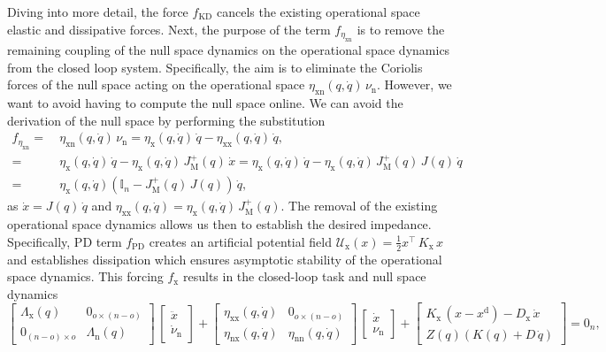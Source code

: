 Diving into more detail, the force $f_\mathrm{KD}$ cancels the existing operational space elastic and dissipative forces.
Next, the purpose of the term $f_{\eta_\mathrm{xn}}$ is to remove the remaining coupling of the null space dynamics on the operational space dynamics from the closed loop system. Specifically, the aim is to eliminate the Coriolis forces of the null space acting on the operational space $\eta_\mathrm{xn}(q,\dot{q}) \, \nu_\mathrm{n}$. However, we want to avoid having to compute the null space online. We can avoid the derivation of the null space by performing the substitution~\citep{ott2008cartesian, della2020model}
\begin{equation}
\begin{split}
    f_{\eta_\mathrm{xn}} =& \: \eta_\mathrm{xn}(q,\dot{q}) \, \nu_\mathrm{n} = \eta_\mathrm{x}(q,\dot{q}) \, \dot{q} - \eta_\mathrm{xx}(q,\dot{q}) \, \dot{q},\\
    =& \: \eta_\mathrm{x}(q,\dot{q}) \, \dot{q} - \eta_\mathrm{x}(q,\dot{q}) \, J_\mathrm{M}^+(q) \, \dot{x} = \eta_\mathrm{x}(q,\dot{q}) \, \dot{q} - \eta_\mathrm{x}(q,\dot{q}) \, J_\mathrm{M}^+(q) \, J(q) \, \dot{q}\\
    =& \: \eta_\mathrm{x}(q,\dot{q}) \left ( \mathbb{I}_n - J_\mathrm{M}^{+}(q) \, J(q)  \right ) \, \dot{q},
\end{split}
\end{equation}
as $\dot{x} = J(q) \, \dot{q}$ and $\eta_\mathrm{xx}(q,\dot{q}) = \eta_\mathrm{x}(q,\dot{q}) \, J_\mathrm{M}^+(q)$.
The removal of the existing operational space dynamics allows us then to establish the desired impedance. Specifically, PD term $f_\mathrm{PD}$ creates an artificial potential field $\mathcal{U}_\mathrm{x}(x) = \frac{1}{2}x^\top \, K_\mathrm{x} \, x$ and establishes dissipation which ensures asymptotic stability of the operational space dynamics.
This forcing $f_\mathrm{x}$ results in the closed-loop task and null space dynamics
\begin{equation}
    \begin{bmatrix}
        \Lambda_\mathrm{x}(q) & 0_{o \times (n-o)}\\
        0_{(n-o) \times o} & \Lambda_\mathrm{n}(q)
    \end{bmatrix} \, \begin{bmatrix}
        \ddot{x}\\
        \dot{\nu}_\mathrm{n}
    \end{bmatrix} + \begin{bmatrix}
        \eta_\mathrm{xx}(q,\dot{q}) & 0_{o \times (n-o)}\\
        \eta_\mathrm{nx}(q,\dot{q}) & \eta_\mathrm{nn}(q,\dot{q})
    \end{bmatrix} \, \begin{bmatrix}
        \dot{x}\\ \nu_\mathrm{n}
    \end{bmatrix} + \begin{bmatrix}
        K_\mathrm{x} \, (x - x^\mathrm{d}) - D_\mathrm{x} \, \dot{x}\\
        Z(q) \left ( K(q) + D \, \dot{q} \right )
    \end{bmatrix} = 0_{n},
\end{equation}
